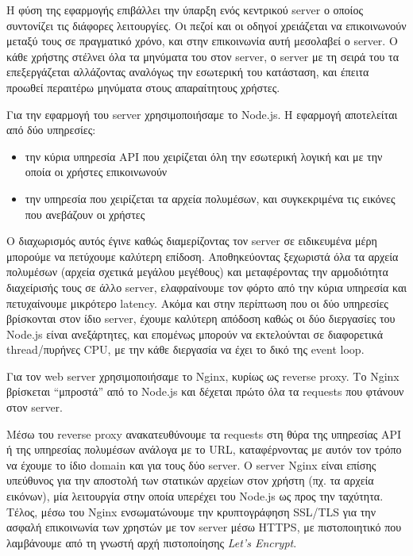 \documentclass[../thesis.tex]{subfiles}
\begin{document}
Η φύση της εφαρμογής επιβάλλει την ύπαρξη ενός κεντρικού server ο οποίος συντονίζει τις διάφορες λειτουργίες.
Οι πεζοί και οι οδηγοί χρειάζεται να επικοινωνούν μεταξύ τους σε πραγματικό χρόνο, και στην επικοινωνία αυτή μεσολαβεί ο server.
Ο κάθε χρήστης στέλνει όλα τα μηνύματα του στον server, ο server με τη σειρά του τα επεξεργάζεται αλλάζοντας αναλόγως την εσωτερική του κατάσταση, και έπειτα προωθεί περαιτέρω μηνύματα στους απαραίτητους χρήστες.

\bigskip

Για την εφαρμογή του server χρησιμοποιήσαμε το Node.js.
Η εφαρμογή αποτελείται από δύο υπηρεσίες:

\begin{itemize}
    \item την κύρια υπηρεσία API που χειρίζεται όλη την εσωτερική λογική και με την οποία οι χρήστες επικοινωνούν
    \item την υπηρεσία που χειρίζεται τα αρχεία πολυμέσων, και συγκεκριμένα τις εικόνες που ανεβάζουν οι χρήστες
\end{itemize}

Ο διαχωρισμός αυτός έγινε καθώς διαμερίζοντας τον server σε ειδικευμένα μέρη μπορούμε να πετύχουμε καλύτερη επίδοση.
Αποθηκεύοντας ξεχωριστά όλα τα αρχεία πολυμέσων (αρχεία σχετικά μεγάλου μεγέθους) και μεταφέροντας την αρμοδιότητα διαχείρισής τους σε άλλο server, ελαφραίνουμε τον φόρτο από την κύρια υπηρεσία και πετυχαίνουμε μικρότερο latency.
Ακόμα και στην περίπτωση που οι δύο υπηρεσίες βρίσκονται στον ίδιο server, έχουμε καλύτερη απόδοση καθώς οι δύο διεργασίες του Node.js είναι ανεξάρτητες, και επομένως μπορούν να εκτελούνται σε διαφορετικά thread/πυρήνες CPU, με την κάθε διεργασία να έχει το δικό της event loop.

\bigskip

Για τον web server χρησιμοποιήσαμε το Nginx, κυρίως ως reverse proxy.
Το Nginx βρίσκεται ``μπροστά'' από το Node.js και δέχεται πρώτο όλα τα requests που φτάνουν στον server.

Μέσω του reverse proxy ανακατευθύνουμε τα requests στη θύρα της υπηρεσίας API ή της υπηρεσίας πολυμέσων ανάλογα με το URL, καταφέρνοντας με αυτόν τον τρόπο να έχουμε το ίδιο domain και για τους δύο server.
Ο server Nginx είναι επίσης υπεύθυνος για την αποστολή των στατικών αρχείων στον χρήστη (πχ. τα αρχεία εικόνων), μία λειτουργία στην οποία υπερέχει του Node.js ως προς την ταχύτητα.
Τέλος, μέσω του Nginx ενσωματώνουμε την κρυπτογράφηση SSL/TLS για την ασφαλή επικοινωνία των χρηστών με τον server μέσω HTTPS, με πιστοποιητικό που λαμβάνουμε από τη γνωστή αρχή πιστοποίησης \textit{Let's Encrypt}.
\end{document}
